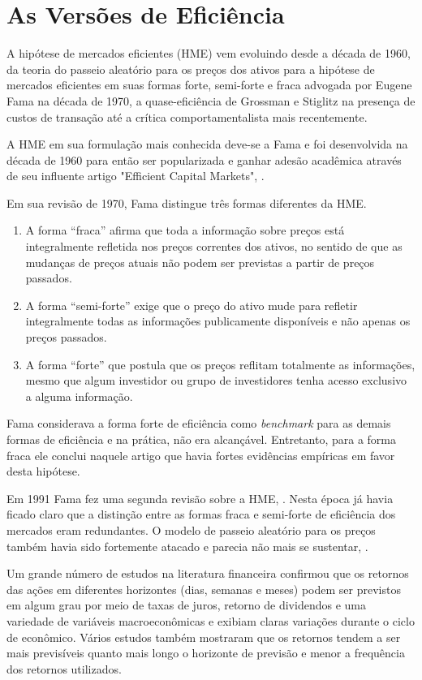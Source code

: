 \chapter{As Versões de Eficiência}
\label{cap:fama}

A hipótese de mercados eficientes (HME) vem evoluindo desde a década de 1960, da teoria do passeio aleatório para os preços dos ativos para a hipótese de mercados eficientes em suas formas forte, semi-forte e fraca advogada por Eugene Fama na década de 1970, a quase-eficiência de Grossman e Stiglitz na presença de custos de transação até a crítica comportamentalista mais recentemente.

A HME em sua formulação mais conhecida deve-se a Fama e foi desenvolvida na década de 1960 para então ser popularizada e ganhar adesão acadêmica através de seu influente artigo "Efficient Capital Markets", .

Em sua revisão de 1970, Fama distingue três formas diferentes da
HME.

\begin{enumerate}
	\item A forma “fraca” afirma que toda a informação sobre preços está integralmente refletida nos preços correntes dos ativos, no sentido de que as mudanças de preços atuais não podem ser previstas a partir de preços passados. 
	\item A forma “semi-forte” exige que o preço do ativo mude para refletir integralmente todas as informações publicamente disponíveis e não apenas os preços passados.
	\item A forma “forte” que postula que os preços reflitam totalmente as informações, mesmo que algum investidor ou grupo de investidores tenha acesso exclusivo a alguma informação.
\end{enumerate}

Fama considerava a forma forte de eficiência como \emph{benchmark} para as demais formas de eficiência e na prática, não era alcançável. Entretanto, para a forma fraca ele conclui naquele artigo que havia fortes evidências empíricas em favor desta hipótese.

Em 1991 Fama fez uma segunda revisão sobre a HME, . Nesta época já havia ficado claro que a distinção entre as formas fraca e semi-forte de eficiência dos mercados eram redundantes. O modelo de passeio aleatório para os preços também havia sido fortemente atacado e parecia não mais se sustentar, .

Um grande número de estudos na literatura financeira confirmou que
os retornos das ações em diferentes horizontes (dias, semanas e meses) podem ser previstos em algum grau por meio de taxas de juros, retorno de dividendos e uma variedade de variáveis macroeconômicas e exibiam claras variações durante o ciclo de econômico. Vários estudos também mostraram que os retornos tendem a ser mais previsíveis quanto mais longo o horizonte de previsão e menor a frequência dos retornos utilizados.

